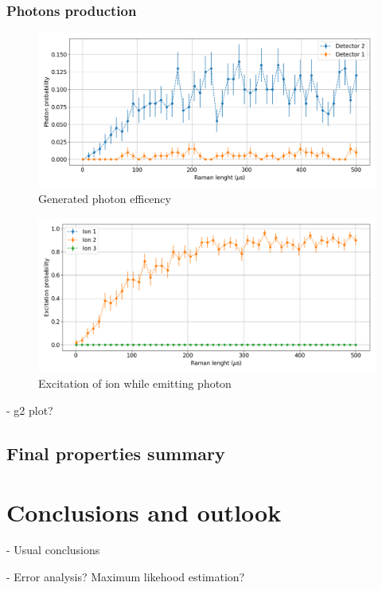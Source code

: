 \documentclass[english, a4paper, 12pt, twoside]{book}
\numberwithin{equation}{section} %
\begin{document}
\subsection{Photons production}
\begin{figure}[H]
\centering
\includegraphics[width=\textwidth]{img/photonefficency_witherror}
\caption{Generated photon efficency}
\end{figure}

\begin{figure}[H]
\centering
\includegraphics[width=\textwidth]{img/ramanlength_witherrors}
\caption{Excitation of ion while emitting photon}
\end{figure}

- g2 plot?
\section{Final properties summary}

\chapter{Conclusions and outlook}
- Usual conclusions

\newpage




\newpage
\renewcommand{\appendixpagename}{Appendix} %
\renewcommand{\appendixtocname}{Appendix} %
\appendixpage
\addappheadtotoc


\begin{appendices}
- Error analysis? Maximum likehood estimation?
\end{appendices}
\end{document}
